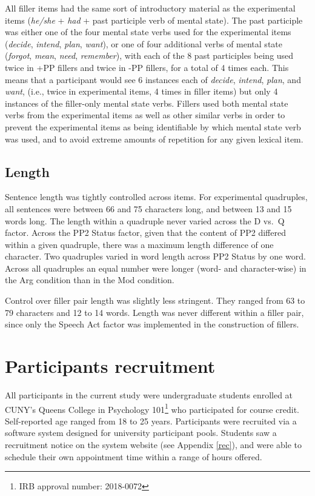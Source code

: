 \documentclass[11pt,oneside]{book}
\let\rmarkdownfootnote\footnote%
\def\footnote{\protect\rmarkdownfootnote}
\begin{document}
All filler items had the same sort of introductory material as the experimental items (\emph{he/she} + \emph{had} + past participle verb of mental state). The past participle was either one of the four mental state verbs used for the experimental items (\emph{decide}, \emph{intend}, \emph{plan}, \emph{want}), or one of four additional verbs of mental state (\emph{forgot}, \emph{mean}, \emph{need}, \emph{remember}), with each of the 8 past participles being used twice in +PP fillers and twice in -PP fillers, for a total of 4 times each. This means that a participant would see 6 instances each of \emph{decide}, \emph{intend}, \emph{plan}, and \emph{want}, (i.e., twice in experimental items, 4 times in filler items) but only 4 instances of the filler-only mental state verbs. Fillers used both mental state verbs from the experimental items as well as other similar verbs in order to prevent the experimental items as being identifiable by which mental state verb was used, and to avoid extreme amounts of repetition for any given lexical item.

\hypertarget{length}{%
\subsection{Length}\label{length}}

Sentence length was tightly controlled across items. For experimental quadruples, all sentences were between 66 and 75 characters long, and between 13 and 15 words long. The length within a quadruple never varied across the D vs.~Q factor. Across the PP2 Status factor, given that the content of PP2 differed within a given quadruple, there was a maximum length difference of one character. Two quadruples varied in word length across PP2 Status by one word. Across all quadruples an equal number were longer (word- and character-wise) in the Arg condition than in the Mod condition.

Control over filler pair length was slightly less stringent. They ranged from 63 to 79 characters and 12 to 14 words. Length was never different within a filler pair, since only the Speech Act factor was implemented in the construction of fillers.

\hypertarget{parti}{%
\section{Participants recruitment}\label{parti}}

All participants in the current study were undergraduate students enrolled at CUNY's Queens College in Psychology 101\footnote{IRB approval number: 2018-0072} who participated for course credit. Self-reported age ranged from 18 to 25 years. Participants were recruited via a software system designed for university participant pools. Students saw a recruitment notice on the system website (see Appendix \ref{rec}), and were able to schedule their own appointment time within a range of hours offered.
\end{document}
